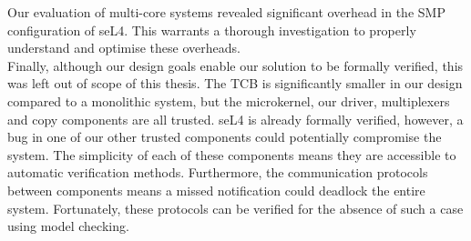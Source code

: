 Our evaluation of multi-core systems revealed significant overhead in the SMP configuration of seL4. This warrants a thorough investigation
to properly understand and optimise these overheads. \\

Finally, although our design goals enable our solution to be formally verified, this was left out of scope of this thesis.
The TCB is significantly smaller in our design compared to a monolithic system, but the microkernel, our driver, multiplexers 
and copy components are all trusted. seL4 is already formally verified, however, a bug in one of our other trusted components 
could potentially compromise the system. The simplicity of each of these components means they are accessible to automatic
verification methods. Furthermore, the communication protocols between components means a missed notification could deadlock
the entire system. Fortunately, these protocols can be verified for the absence of such a case using model checking. \\
